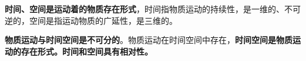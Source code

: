 \textbf{{时间、空间是运动着的物质存在形式}}，时间指物质运动的持续性，是一维的、不可逆的，空间是指运动物质的广延性，是三维的。

\textbf{{物质运动与时间空间是不可分的}}。物质运动在时间空间中存在，\textbf{{{时间空间是物质运动的存在形式。}}{时间和空间具有相对性。}}
